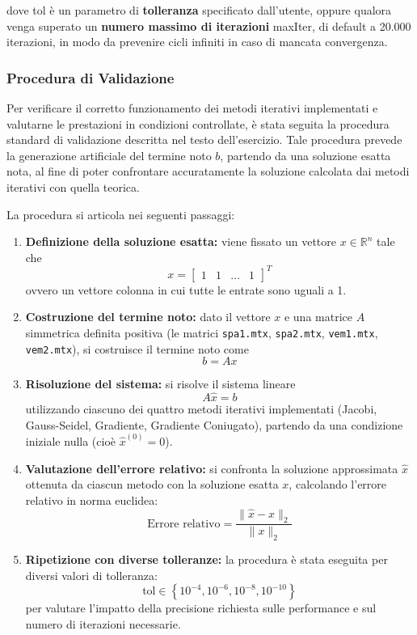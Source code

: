 dove tol è un parametro di \textbf{tolleranza} specificato dall’utente, oppure qualora venga superato un \textbf{numero massimo di iterazioni} maxIter, di default a 20.000 iterazioni, in modo da prevenire cicli infiniti in caso di mancata convergenza.\\

\subsubsection{Procedura di Validazione}

Per verificare il corretto funzionamento dei metodi iterativi implementati e valutarne le prestazioni in condizioni controllate, è stata seguita la procedura standard di validazione descritta nel testo dell'esercizio. Tale procedura prevede la generazione artificiale del termine noto \( b \), partendo da una soluzione esatta nota, al fine di poter confrontare accuratamente la soluzione calcolata dai metodi iterativi con quella teorica.

La procedura si articola nei seguenti passaggi:

\begin{enumerate}
    \item \textbf{Definizione della soluzione esatta:} viene fissato un vettore \( x \in \mathbb{R}^n \) tale che
    \[
    x = \begin{bmatrix} 1 & 1 & \dots & 1 \end{bmatrix}^T
    \]
    ovvero un vettore colonna in cui tutte le entrate sono uguali a 1.

    \item \textbf{Costruzione del termine noto:} dato il vettore \( x \) e una matrice \( A \) simmetrica definita positiva (le matrici \texttt{spa1.mtx}, \texttt{spa2.mtx}, \texttt{vem1.mtx}, \texttt{vem2.mtx}), si costruisce il termine noto come
    \[
    b = A x
    \]

    \item \textbf{Risoluzione del sistema:} si risolve il sistema lineare
    \[
    A \hat{x} = b
    \]
    utilizzando ciascuno dei quattro metodi iterativi implementati (Jacobi, Gauss-Seidel, Gradiente, Gradiente Coniugato), partendo da una condizione iniziale nulla (cioè \(\hat{x}^{(0)} = 0\)).

    \item \textbf{Valutazione dell'errore relativo:} si confronta la soluzione approssimata \( \hat{x} \) ottenuta da ciascun metodo con la soluzione esatta \( x \), calcolando l'errore relativo in norma euclidea:
    \[
    \text{Errore relativo} = \frac{\| \hat{x} - x \|_2}{\| x \|_2}
    \]

    \item \textbf{Ripetizione con diverse tolleranze:} la procedura è stata eseguita per diversi valori di tolleranza:
    \[
    \text{tol} \in \left\{ 10^{-4}, 10^{-6}, 10^{-8}, 10^{-10} \right\}
    \]
    per valutare l'impatto della precisione richiesta sulle performance e sul numero di iterazioni necessarie.

\end{enumerate}

